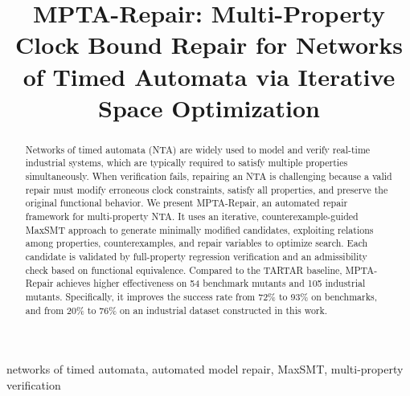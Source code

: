 \documentclass[conference]{IEEEtran}
\begin{document}
\title{MPTA-Repair: Multi-Property Clock Bound Repair for Networks of Timed Automata via Iterative Space Optimization}
\author{%
}
\maketitle
\begingroup
\renewcommand{\thefootnote}{}
\endgroup
\begin{abstract}
Networks of timed automata (NTA) are widely used to model and verify real-time industrial systems, which are typically required to satisfy multiple properties simultaneously. When verification fails, repairing an NTA is challenging because a valid repair must modify erroneous clock constraints, satisfy all properties, and preserve the original functional behavior. We present MPTA-Repair, an automated repair framework for multi-property NTA. It uses an iterative, counterexample-guided MaxSMT approach to generate minimally modified candidates, exploiting relations among properties, counterexamples, and repair variables to optimize search. Each candidate is validated by full-property regression verification and an admissibility check based on functional equivalence. Compared to the TARTAR baseline, MPTA-Repair achieves higher effectiveness on 54 benchmark mutants and 105 industrial mutants. Specifically, it improves the success rate from 72\% to 93\% on benchmarks, and from 20\% to 76\% on an industrial dataset constructed in this work.
\end{abstract}
\begin{IEEEkeywords}
networks of timed automata, automated model repair, MaxSMT, multi-property verification
\end{IEEEkeywords}







\end{document}
